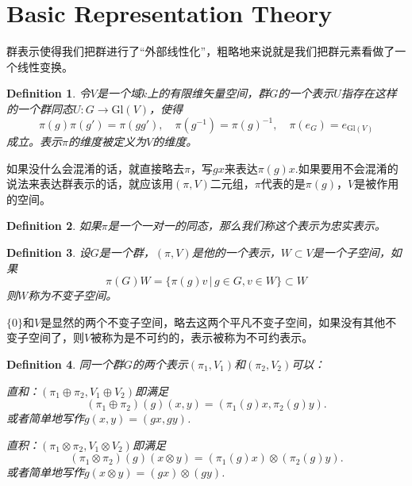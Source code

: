 \documentclass[9pt]{extbook}
\theoremstyle{plain}
\newtheorem{defi}{Definition}
\begin{document}
\section{Basic Representation Theory}
群表示使得我们把群进行了“外部线性化”，粗略地来说就是我们把群元素看做了一个线性变换。
\begin{defi}
令$V$是一个域$k$上的有限维矢量空间，群$G$的一个表示$U$指存在这样的一个群同态$U:G\rightarrow \mathrm{Gl}(V)$，使得
\[
	\pi(g)\pi(g')=\pi(gg'),\quad \pi(g^{-1})=\pi(g)^{-1},\quad \pi(e_G)=e_{\mathrm{Gl}(V)}
\]
成立。表示$\pi$的维度被定义为$V$的维度。
\end{defi}
如果没什么会混淆的话，就直接略去$\pi$，写$gx$来表达$\pi(g)x$.如果要用不会混淆的说法来表达群表示的话，就应该用$(\pi,V)$二元组，$\pi$代表的是$\pi(g)$，$V$是被作用的空间。
\begin{defi}
如果$\pi$是一个一对一的同态，那么我们称这个表示为忠实表示。
\end{defi}
\begin{defi}
设$G$是一个群，$(\pi,V)$是他的一个表示，$W\subset V$是一个子空间，如果
\[
\pi(G)W=\{\pi(g)v\,|\,g\in G,v\in W\}\subset W
\]
则$W$称为不变子空间。
\end{defi}
$\{0\}$和$V$是显然的两个不变子空间，略去这两个平凡不变子空间，如果没有其他不变子空间了，则$V$被称为是不可约的，表示被称为不可约表示。

\begin{defi}
同一个群$G$的两个表示$(\pi_1,V_1)$和$(\pi_2,V_2)$可以：

 直和：$(\pi_1\oplus \pi_2,V_1\oplus V_2)$即满足
\[
	(\pi_1\oplus \pi_2)(g)(x,y)=(\pi_1(g)x,\pi_2(g)y).
\]
或者简单地写作$g(x,y)=(gx,gy)$.

 直积：$(\pi_1\otimes \pi_2,V_1\otimes V_2)$即满足
\[
	(\pi_1\otimes \pi_2)(g)(x\otimes y)=(\pi_1(g)x)\otimes (\pi_2(g)y).
\]
或者简单地写作$g(x\otimes y)=(gx)\otimes(gy)$.
\end{defi}
\end{document}
